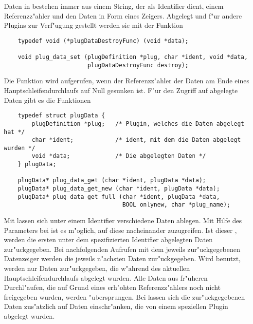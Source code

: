 Daten in \icewing{} bestehen immer aus einem String, der als
Identifier dient, einem Referenzz"ahler und den Daten in Form eines
Zeigers. Abgelegt und f"ur andere Plugins zur Verf"ugung gestellt
werden sie mit der Funktion
\begin{small}
\linespread{0.9}
\begin{verbatim}
    typedef void (*plugDataDestroyFunc) (void *data);

    void plug_data_set (plugDefinition *plug, char *ident, void *data,
                        plugDataDestroyFunc destroy);
\end{verbatim}
\end{small}
Die Funktion  wird aufgerufen, wenn der
Referenzz"ahler der Daten am Ende eines Hauptschleifendurchlaufs auf
Null gesunken ist. F"ur den Zugriff auf abgelegte Daten gibt es die
Funktionen
\begin{small}
\linespread{0.9}
\begin{verbatim}
    typedef struct plugData {
        plugDefinition *plug;   /* Plugin, welches die Daten abgelegt hat */
        char *ident;            /* ident, mit dem die Daten abgelegt wurden */
        void *data;             /* Die abgelegten Daten */
    } plugData;

    plugData* plug_data_get (char *ident, plugData *data);
    plugData* plug_data_get_new (char *ident, plugData *data);
    plugData* plug_data_get_full (char *ident, plugData *data,
                                  BOOL onlynew, char *plug_name);
\end{verbatim}
\end{small}
Mit  lassen sich unter einem Identifier
verschiedene Daten ablegen. Mit Hilfe des Parameters  bei
 ist es m"oglich, auf diese nacheinander
zuzugreifen. Ist dieser , werden die ersten unter dem
spezifizierten Identifier abgelegten Daten zur"uckgegeben. Bei
nachfolgenden Aufrufen mit dem jeweils zur"uckgegebenen Datenzeiger
werden die jeweils n"achsten Daten zur"uckgegeben. Wird
 benutzt, werden nur Daten
zur"uckgegeben, die w"ahrend des aktuellen Hauptschleifendurchlaufs
abgelegt wurden. Alle Daten aus fr"uheren Durchl"aufen, die auf
Grund eines erh"ohten Referenzz"ahlers noch nicht freigegeben
wurden, werden "ubersprungen. Bei 
lassen sich die zur"uckgegebenen Daten zus"atzlich auf Daten
einschr"anken, die von einem speziellen Plugin abgelegt wurden.

